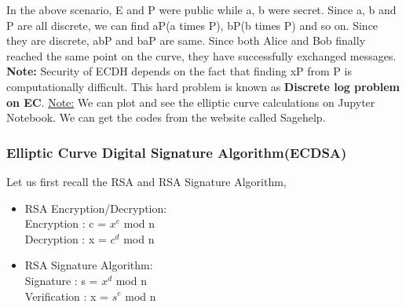 \documentclass[11pt]{article}
\begin{document}
In the above scenario, E and P were public while a, b were secret. Since a, b and P are all discrete, we can find aP(a times P), bP(b times P) and so on. Since they are discrete, abP and baP are same. Since both Alice and Bob finally reached the same point on the curve, they have successfully exchanged messages.\\
\newline
\textbf{Note:} Security of ECDH depends on the fact that finding xP from P is computationally difficult. This hard problem is known as \textbf{Discrete log problem on EC}.
\underline{Note:} We can plot and see the elliptic curve calculations on Jupyter Notebook. We can get the codes from the website called Sagehelp.
\subsubsection{Elliptic Curve Digital Signature Algorithm(ECDSA)}
Let us first recall the RSA and RSA Signature Algorithm,
\begin{center}
    \begin{itemize}
        \item RSA Encryption/Decryption:\\
        Encryption : c = $x^e$ mod n\\
        Decryption : x = $c^d$ mod n\\
    
        \item RSA Signature Algorithm:\\
        Signature : s = $x^d$ mod n\\
        Verification : x = $s^e$ mod n\\
    \end{itemize}
\end{center}
\end{document}
